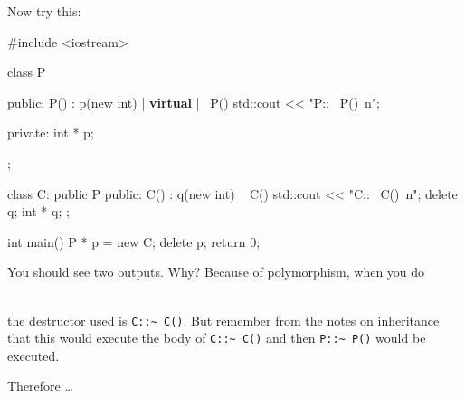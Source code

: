 Now try this:

\begin{consolethree}[escapeinside=||]
#include <iostream>

class P
{
public:
     P() : p(new int) {}
     |\textbf{ virtual }|~ P() { std::cout << "P::~ P()\ n"; }

private:
     int * p;
};

class C: public P
{
public:
     C() : q(new int) {}
     ~ C() { std::cout << "C::~ C()\ n"; delete q; }
     int * q;
};

int main()
{   
    P * p = new C;
    delete p;
    return 0;
}
\end{consolethree}

You should see two outputs. Why? Because of polymorphism, when you do

\\

the destructor used is \verb!C::~ C()!. But remember from the notes on inheritance that this would execute the body of \verb!C::~ C()! and then \verb!P::~ P()! would be executed.

Therefore \ldots {}

